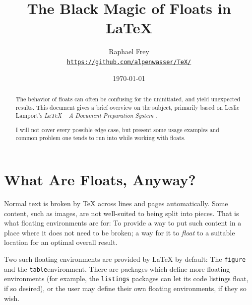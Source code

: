 \documentclass[article,a4paper,oneside,10pt]{memoir}
\title{\textsf{\Huge  The Black Magic of Floats in \LaTeX}}
\author{Raphael Frey\\[2mm]\small%
    \href{https://github.com/alpenwasser/TeX/tree/master/floats}
         {\nolinkurl{https://github.com/alpenwasser/TeX/}}}
\date{\vspace{1em}\today}
\begin{document}


\maketitle

\begin{abstract}
    The behavior  of floats can  often be  confusing for the  uninitiated, and
    yield  unexpected results. This  document gives  a brief  overview on  the
    subject, primarily based on Leslie  Lamport's \emph{\LaTeX{} -- A Document
    Preparation System} \cite{lamport}.

    I will not cover every possible edge case, but present some usage examples
    and common problem one tends to run into while working with floats.
\end{abstract}

\tableofcontents*
\listoflistings
\listoffigures
\listoftables


\newpage
\chapter{What Are Floats, Anyway?}
\label{chap:what-are-floats}

Normal text  is broken  by \TeX{} across  lines and  pages automatically. Some
content, such as images, are not  well-suited to being split into pieces. That
is what floating environments are for: To provide a way to put such content in
a place where it does not need to be broken; a way for it to \emph{float} to a
suitable location for an optimal overall result.

Two  such  floating environments  are  provided  by \LaTeX{}  by  default: The
\verb|figure|   and  the   \verb|table|\footnotemark  environment. There   are
packages   which  define   more  floating   environments  (for   example,  the
\verb|listings| packages can  let its code listings float, if  so desired), or
the user may define their own floating environments, if they so wish.

\end{document}
